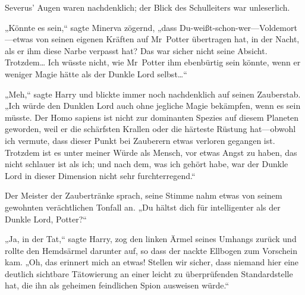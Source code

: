 Severus' Augen waren nachdenklich; der Blick des Schulleiters war unleserlich.

„Könnte es sein,“ sagte Minerva zögernd, „dass Du-weißt-schon-wer—Voldemort—etwas von seinen eigenen Kräften auf Mr~Potter übertragen hat, in der Nacht, als er ihm diese Narbe verpasst hat? Das war sicher nicht seine Absicht. Trotzdem… Ich wüsste nicht, wie Mr~Potter ihm ebenbürtig sein könnte, wenn er weniger Magie hätte als der Dunkle Lord selbst…“

„Meh,“ sagte Harry und blickte immer noch nachdenklich auf seinen Zauberstab. „Ich würde den Dunklen Lord auch ohne jegliche Magie bekämpfen, wenn es sein müsste. Der Homo sapiens ist nicht zur dominanten Spezies auf diesem Planeten geworden, weil er die schärfsten Krallen oder die härteste Rüstung hat—obwohl ich vermute, dass dieser Punkt bei Zauberern etwas verloren gegangen ist. Trotzdem ist es unter meiner Würde als Mensch, vor etwas Angst zu haben, das nicht schlauer ist als ich; und nach dem, was ich gehört habe, war der Dunkle Lord in dieser Dimension nicht sehr furchterregend.“

Der Meister der Zaubertränke sprach, seine Stimme nahm etwas von seinem gewohnten verächtlichen Tonfall an. „Du hältst dich für intelligenter als der Dunkle Lord, Potter?“

„Ja, in der Tat,“ sagte Harry, zog den linken Ärmel seines Umhangs zurück und rollte den Hemdsärmel darunter auf, so dass der nackte Ellbogen zum Vorschein kam. „Oh, das erinnert mich an etwas! Stellen wir sicher, dass niemand hier eine deutlich sichtbare Tätowierung an einer leicht zu überprüfenden Standardstelle hat, die ihn als geheimen feindlichen Spion ausweisen würde.“

